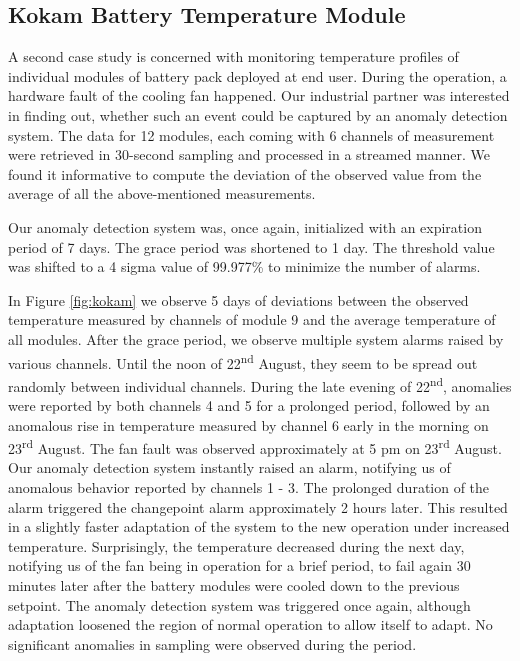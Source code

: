 \subsection{Kokam Battery Temperature Module}\label{AA:Kokam}
A second case study is concerned with monitoring temperature profiles of individual modules of battery pack deployed at end user. During the operation, a hardware fault of the cooling fan happened. Our industrial partner was interested in finding out, whether such an event could be captured by an anomaly detection system. The data for 12 modules, each coming with 6 channels of measurement were retrieved in 30-second sampling and processed in a streamed manner. We found it informative to compute the deviation of the observed value from the average of all the above-mentioned measurements.

Our anomaly detection system was, once again, initialized with an expiration period of 7 days. The grace period was shortened to 1 day. The threshold value was shifted to a 4 sigma value of 99.977\% to minimize the number of alarms.

In Figure \ref{fig:kokam} we observe 5 days of deviations between the observed temperature measured by channels of module 9 and the average temperature of all modules. After the grace period, we observe multiple system alarms raised by various channels. Until the noon of 22\textsuperscript{nd} August, they seem to be spread out randomly between individual channels. During the late evening of 22\textsuperscript{nd}, anomalies were reported by both channels 4 and 5 for a prolonged period, followed by an anomalous rise in temperature measured by channel 6 early in the morning on 23\textsuperscript{rd} August. The fan fault was observed approximately at 5 pm on 23\textsuperscript{rd} August. Our anomaly detection system instantly raised an alarm, notifying us of anomalous behavior reported by channels 1 - 3. The prolonged duration of the alarm triggered the changepoint alarm approximately 2 hours later. This resulted in a slightly faster adaptation of the system to the new operation under increased temperature. Surprisingly, the temperature decreased during the next day, notifying us of the fan being in operation for a brief period, to fail again 30 minutes later after the battery modules were cooled down to the previous setpoint. The anomaly detection system was triggered once again, although adaptation loosened the region of normal operation to allow itself to adapt. No significant anomalies in sampling were observed during the period.

